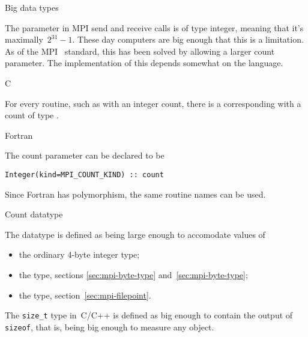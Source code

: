 
 {Big data types}
\label{sec:mpi-bigdata}

The  parameter in MPI send and receive calls is of type integer,
meaning that it's maximally~$2^{31}-1$. These day computers are big enough
that this is a limitation.
As of the MPI~ standard, this has been solved by allowing a
larger count parameter.
The implementation of this depends somewhat on the language.

\begin{mpifour}

 {C}
\label{sec:c-mpi-count}

For every routine, such as  with an integer count,
there is a corresponding  with a count
of type .


 {Fortran}

The count parameter can be declared  to be
\begin{lstlisting}
Integer(kind=MPI_COUNT_KIND) :: count
\end{lstlisting}
Since Fortran has polymorphism, the same routine names can be used.

\end{mpifour}

 {Count datatype}

The  datatype is defined as being large enough
to accomodate values of
\begin{itemize}
\item the ordinary 4-byte integer type;
\item the  type, sections
  \ref{sec:mpi-byte-type} and~\ref{sec:mpi-byte-type};
\item the  type, section~\ref{sec:mpi-filepoint}.
\end{itemize}

The \lstinline+size_t+ type in~C/C++ is defined as big enough to
contain the output of \lstinline+sizeof+, that is,
being big enough to measure any object.

